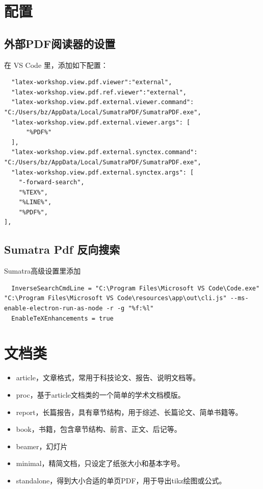 \section{配置}

\subsection{外部PDF阅读器的设置}

在 VS Code 里，添加如下配置：

\begin{lstlisting}
  "latex-workshop.view.pdf.viewer":"external",
  "latex-workshop.view.pdf.ref.viewer":"external",
  "latex-workshop.view.pdf.external.viewer.command": "C:/Users/bz/AppData/Local/SumatraPDF/SumatraPDF.exe",
  "latex-workshop.view.pdf.external.viewer.args": [
      "%PDF%"
  ],
  "latex-workshop.view.pdf.external.synctex.command": "C:/Users/bz/AppData/Local/SumatraPDF/SumatraPDF.exe",
  "latex-workshop.view.pdf.external.synctex.args": [
    "-forward-search",
    "%TEX%",
    "%LINE%",
    "%PDF%",
],
\end{lstlisting}

\subsection{Sumatra Pdf 反向搜索}

Sumatra高级设置里添加

\begin{lstlisting}
  InverseSearchCmdLine = "C:\Program Files\Microsoft VS Code\Code.exe" "C:\Program Files\Microsoft VS Code\resources\app\out\cli.js" --ms-enable-electron-run-as-node -r -g "%f:%l"
  EnableTeXEnhancements = true
\end{lstlisting}

\section{文档类}

\begin{itemize}
  \item article，文章格式，常用于科技论文、报告、说明文档等。
  \item proc，基于article文档类的一个简单的学术文档模版。
  \item report，长篇报告，具有章节结构，用于综述、长篇论文、简单书籍等。
  \item book，书籍，包含章节结构、前言、正文、后记等。
  \item beamer，幻灯片
  \item minimal，精简文档，只设定了纸张大小和基本字号。
  \item standalone，得到大小合适的单页PDF，用于导出tikz绘图或公式。
\end{itemize}

